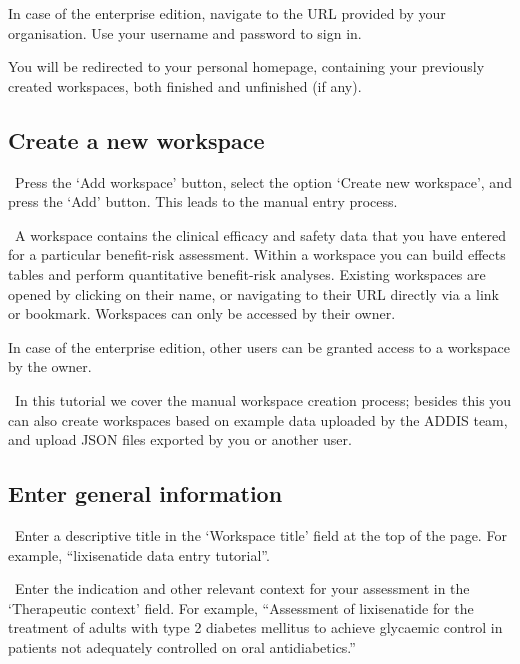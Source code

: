 \documentclass[00_mcda_tutorial.tex]{subfiles}
\begin{document}
\begin{sidebar*}
In case of the enterprise edition, navigate to the URL provided by your organisation. Use your username and password to sign in.
\end{sidebar*}

You will be redirected to your personal homepage, containing your previously created workspaces, both finished and unfinished (if any).

\subsection*{Create a new workspace}
\leftpointright \, Press the ‘Add workspace’ button, select the option ‘Create new workspace’, and press the ‘Add’ button.
This leads to the manual entry process.
\newline

\noindent \faGraduationCap \, A workspace contains the clinical efficacy and safety data that you have entered for a particular benefit-risk assessment. Within a workspace you can build effects tables and perform quantitative benefit-risk analyses. Existing workspaces are opened by clicking on their name, or navigating to their URL directly via a link or bookmark. Workspaces can only be accessed by their owner.

\begin{sidebar*}
In case of the enterprise edition, other users can be granted access to a workspace by the owner.
\end{sidebar*}

\noindent \faLightbulbO \, In this tutorial we cover the manual workspace creation process; besides this you can also create workspaces based on example data uploaded by the ADDIS team, and upload JSON files exported by you or another user.

\subsection*{Enter general information}
\noindent \leftpointright \, Enter a descriptive title in the ‘Workspace title’ field at the top of the page. For example, “lixisenatide data entry tutorial”.
\newline

\noindent \leftpointright \, Enter the indication and other relevant context for your assessment in the ‘Therapeutic context’ field. For example, “Assessment of lixisenatide for the treatment of adults with type 2 diabetes mellitus to achieve glycaemic control in patients not adequately controlled on oral antidiabetics.”
\newline
\end{document}
